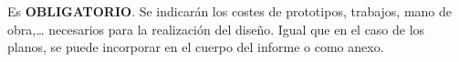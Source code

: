 \noindent Es \textbf{OBLIGATORIO}.
Se indicarán los costes de prototipos, trabajos, mano de obra,… necesarios para la realización del diseño. Igual que en el caso de los planos, se puede incorporar en el cuerpo del informe o como anexo. 
